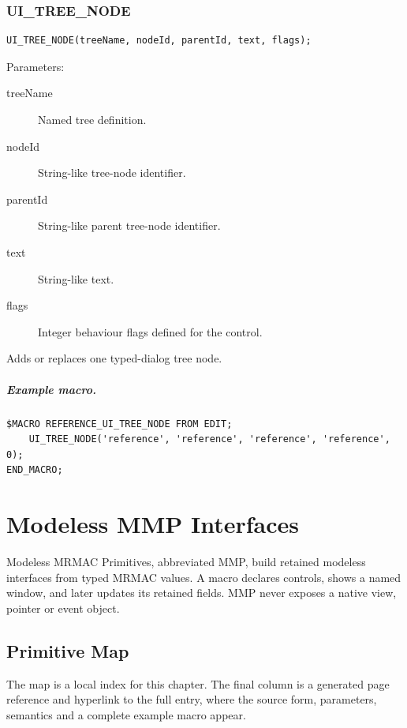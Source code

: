 \documentclass[a4paper,10pt,twoside,openany]{book}
\newenvironment{mrmacextension}{\begin{changebar}}{\end{changebar}}
\begin{document}
\begin{mrmacextension}
\label{prim:procedure-ui-tree-node}
\subsection*{UI\_TREE\_NODE}
\begin{verbatim}
UI_TREE_NODE(treeName, nodeId, parentId, text, flags);
\end{verbatim}
Parameters:
\begin{description}
\item[treeName] Named tree definition.
\item[nodeId] String-like tree-node identifier.
\item[parentId] String-like parent tree-node identifier.
\item[text] String-like text.
\item[flags] Integer behaviour flags defined for the control.
\end{description}

Adds or replaces one typed-dialog tree node.

\paragraph{Example macro.}
\begin{verbatim}
$MACRO REFERENCE_UI_TREE_NODE FROM EDIT;
    UI_TREE_NODE('reference', 'reference', 'reference', 'reference', 0);
END_MACRO;
\end{verbatim}
\end{mrmacextension}


\chapter{Modeless MMP Interfaces}

Modeless MRMAC Primitives, abbreviated MMP, build retained modeless interfaces from typed MRMAC values. A macro declares controls, shows a named window, and later updates its retained fields. MMP never exposes a native view, pointer or event object.

\section{Primitive Map}
The map is a local index for this chapter. The final column is a generated page
reference and hyperlink to the full entry, where the source form, parameters,
semantics and a complete example macro appear.
\end{document}

